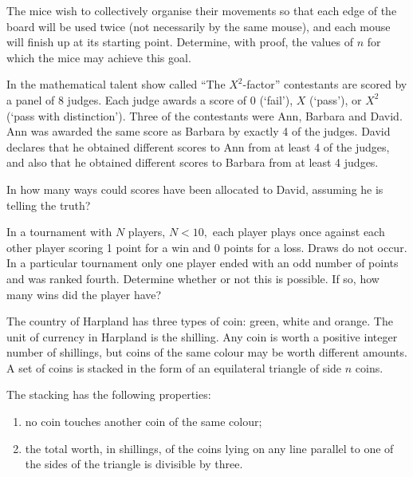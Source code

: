 \documentclass{pset}
\begin{document}
\begin{problems}
\begin{problem}[IrMO 2012 Q10]
The mice wish to collectively organise their movements so that each edge of the board will be used twice (not necessarily by the same mouse), and each mouse will finish up at its starting point. Determine, with proof, the values of \(n\) for which the mice may achieve this goal.
\end{problem}



\begin{problem}[IrMO 2011 Q5]
    In the mathematical talent show called ``The $X^2$-factor'' contestants are scored by a panel of 8 judges. Each judge awards a score of 0 (`fail'), $X$ (`pass'), or $X^2$ (`pass with distinction'). Three of the contestants were Ann, Barbara and David. Ann was awarded the same score as Barbara by exactly 4 of the judges. David declares that he obtained different scores to Ann from at least 4 of the judges, and also that he obtained different scores to Barbara from at least 4 judges.

    In how many ways could scores have been allocated to David, assuming he is telling the truth?
\end{problem}


\begin{problem}[IrMO 2011 Q6]
    In a tournament with \(N\) players, \(N<10,\) each player plays once against each other player scoring 1 point for a win and 0 points for a loss. Draws do not occur. In a particular tournament only one player ended with an odd number of points and was ranked fourth. Determine whether or not this is possible. If so, how many wins did the player have?
\end{problem}

\begin{problem}[IrMO 2010 Q4]
    The country of Harpland has three types of coin: green, white and orange. The unit of currency in Harpland is the shilling. Any coin is worth a positive integer number of shillings, but coins of the same colour may be worth different amounts.
    A set of coins is stacked in the form of an equilateral triangle of side \(n\) coins.

    The stacking has the following properties:
    \begin{enumerate}
        \item no coin touches another coin of the same colour;
        \item the total worth, in shillings, of the coins lying on any line parallel to one of the sides of the triangle is divisible by three.
    \end{enumerate}


\end{problem}
\end{problems}
\end{document}
